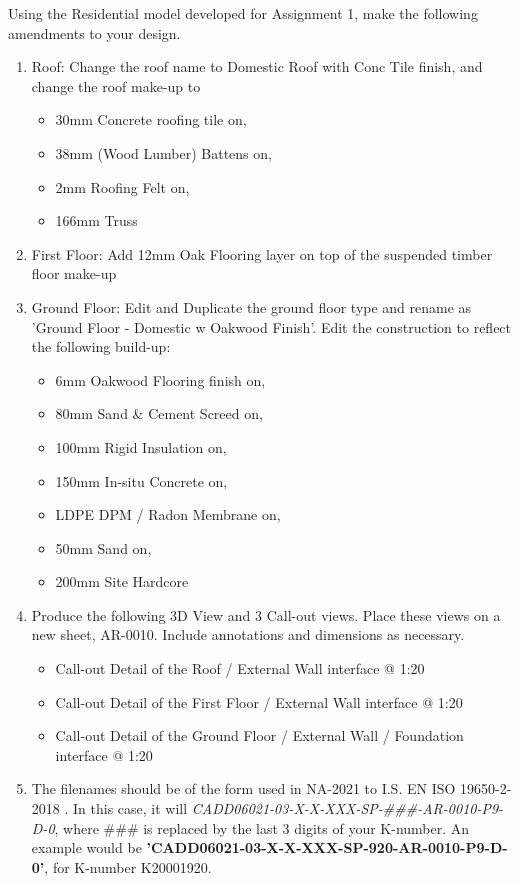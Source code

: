 Using the Residential model developed for Assignment 1, make the following amendments to your design.
\begin{enumerate}
	\item\label{itm:roof} Roof: Change the roof name to Domestic Roof with Conc Tile finish, and change the roof make-up to 
	\begin{itemize}
		\item 30mm Concrete roofing tile on,
		\item 38mm (Wood Lumber) Battens on,
		\item 2mm Roofing Felt on,
		\item 166mm Truss
	\end{itemize}
	\item\label{itm:FirstFloor} First Floor: Add 12mm Oak Flooring layer on top of the suspended timber floor make-up
	\item\label{itm:GroundFloor} Ground Floor: Edit and Duplicate the ground floor type and rename as 'Ground Floor - Domestic w Oakwood Finish'.  Edit the construction to reflect the following build-up:
	\begin{itemize}
		\item 6mm Oakwood Flooring finish on,
		\item 80mm Sand \& Cement Screed on,
		\item 100mm Rigid Insulation on,
		\item 150mm In-situ Concrete on,
		\item LDPE DPM / Radon Membrane on,
		\item 50mm Sand on,
		\item 200mm Site Hardcore
	\end{itemize}
	\item Produce the following 3D View and 3 Call-out views. Place these views on a new sheet, AR-0010.  Include annotations and dimensions as necessary.
	\begin{itemize}
		\item Call-out Detail of the Roof / External Wall interface @ 1:20
		\item Call-out Detail of the First Floor / External Wall interface @ 1:20
		\item Call-out Detail of the Ground Floor / External Wall / Foundation interface @ 1:20
	\end{itemize}
	\item The filenames should be of the form used in NA-2021 to I.S. EN ISO 19650-2-2018
	.  In this case, it will \textit{CADD06021-03-X-X-XXX-SP-\#\#\#-AR-0010-P9-D-0}, where \#\#\# is replaced by the last 3 digits of your K-number. An example would be \textbf{'CADD06021-03-X-X-XXX-SP-920-AR-0010-P9-D-0'}, for K-number K20001920.
\end{enumerate}


